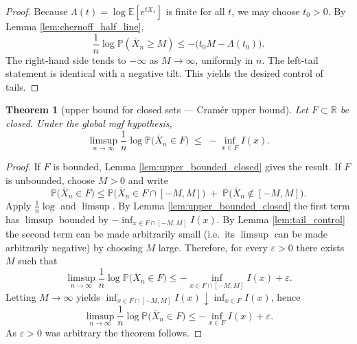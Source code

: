 \documentclass[12pt]{article}
\newtheorem{theorem}{Theorem}[section]
\theoremstyle{definition}
\theoremstyle{remark}
\begin{document}
\begin{proof}
Because $\Lambda(t)=\log\mathbb{E}[e^{tX_1}]$ is finite for all $t$, we may choose
$t_0>0$. By Lemma \ref{lem:chernoff_half_line},
\[
\frac{1}{n}\log \mathbb{P}(\overline X_n \ge M) \le -\big( t_0 M - \Lambda(t_0)\big).
\]
The right-hand side tends to $-\infty$ as $M\to\infty$, uniformly in $n$. The
left-tail statement is identical with a negative tilt. This yields the desired
control of tails.
\end{proof}

\begin{theorem}[upper bound for closed sets --- Cramér upper bound]\label{thm:cramer_upper}
Let $F\subset\mathbb R$ be closed. Under the global mgf hypothesis,
\[
\limsup_{n\to\infty}\frac{1}{n}\log \mathbb{P}\big( \overline X_n \in F \big)
\;\le\; -\inf_{x\in F} I(x).
\]
\end{theorem}

\begin{proof}
If $F$ is bounded, Lemma \ref{lem:upper_bounded_closed} gives the result.
If $F$ is unbounded, choose $M>0$ and write
\[
\mathbb{P}\big(\overline X_n\in F\big)
\le \mathbb{P}\big(\overline X_n \in F\cap[-M,M]\big)
      \;+\; \mathbb{P}\big(\overline X_n\notin[-M,M]\big).
\]
Apply $\frac{1}{n}\log$ and $\limsup$. By Lemma \ref{lem:upper_bounded_closed} the
first term has $\limsup$ bounded by $-\inf_{x\in F\cap[-M,M]} I(x)$. By Lemma
\ref{lem:tail_control} the second term can be made arbitrarily small (i.e.\ its
$\limsup$ can be made arbitrarily negative) by choosing $M$ large. Therefore, for
every $\varepsilon>0$ there exists $M$ such that
\[
\limsup_{n\to\infty}\frac{1}{n}\log \mathbb{P}\big(\overline X_n\in F\big)
\le -\inf_{x\in F\cap[-M,M]} I(x) + \varepsilon.
\]
Letting $M\to\infty$ yields $\inf_{x\in F\cap[-M,M]} I(x)\downarrow \inf_{x\in F} I(x)$,
hence
\[
\limsup_{n\to\infty}\frac{1}{n}\log \mathbb{P}\big(\overline X_n\in F\big)
\le -\inf_{x\in F} I(x) + \varepsilon.
\]
As $\varepsilon>0$ was arbitrary the theorem follows.
\end{proof}
\end{document}

